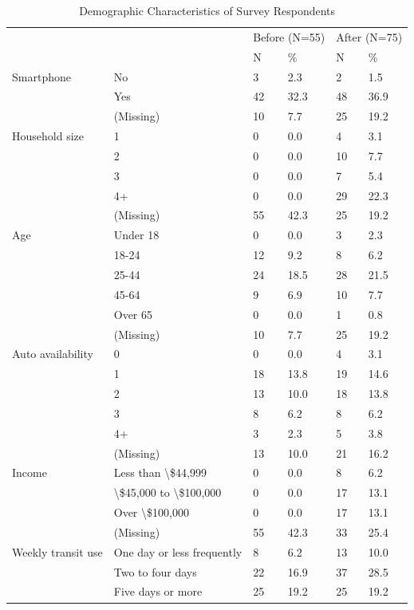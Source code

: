 \documentclass[smartcities,article,submit,moreauthors,pdftex]{Definitions/mdpi}
\begin{document}
\begin{table}[ht]
    \centering
    \caption{Demographic Characteristics of Survey Respondents}
    \label{tab:survey-respondents}
 \renewcommand{\arraystretch}{1.5}
\begin{tabular}[t]{llllll}
\toprule
\multicolumn{2}{c}{ } & \multicolumn{2}{c}{Before (N=55)} & \multicolumn{2}{c}{After (N=75)} \\
\cmidrule(l{3pt}r{3pt}){3-4} \cmidrule(l{3pt}r{3pt}){5-6}
  &    & N & \% & N  & \% \\
\midrule
Smartphone & No & 3 & 2.3 & 2 & 1.5\\
 & Yes & 42 & 32.3 & 48 & 36.9\\
 & (Missing) & 10 & 7.7 & 25 & 19.2\\
Household size & 1 & 0 & 0.0 & 4 & 3.1\\
 & 2 & 0 & 0.0 & 10 & 7.7\\
 & 3 & 0 & 0.0 & 7 & 5.4\\
 & 4+ & 0 & 0.0 & 29 & 22.3\\
 & (Missing) & 55 & 42.3 & 25 & 19.2\\
Age & Under 18 & 0 & 0.0 & 3 & 2.3\\
 & 18-24 & 12 & 9.2 & 8 & 6.2\\
 & 25-44 & 24 & 18.5 & 28 & 21.5\\
 & 45-64 & 9 & 6.9 & 10 & 7.7\\
 & Over 65 & 0 & 0.0 & 1 & 0.8\\
 & (Missing) & 10 & 7.7 & 25 & 19.2\\
Auto availability & 0 & 0 & 0.0 & 4 & 3.1\\
 & 1 & 18 & 13.8 & 19 & 14.6\\
 & 2 & 13 & 10.0 & 18 & 13.8\\
 & 3 & 8 & 6.2 & 8 & 6.2\\
 & 4+ & 3 & 2.3 & 5 & 3.8\\
 & (Missing) & 13 & 10.0 & 21 & 16.2\\
Income & Less than \textbackslash{}\$44,999 & 0 & 0.0 & 8 & 6.2\\
 & \textbackslash{}\$45,000 to \textbackslash{}\$100,000 & 0 & 0.0 & 17 & 13.1\\
 & Over \textbackslash{}\$100,000 & 0 & 0.0 & 17 & 13.1\\
 & (Missing) & 55 & 42.3 & 33 & 25.4\\
Weekly transit use & One day or less frequently & 8 & 6.2 & 13 & 10.0\\
 & Two to four days & 22 & 16.9 & 37 & 28.5\\
 & Five days or more & 25 & 19.2 & 25 & 19.2\\
\bottomrule
\end{tabular}
\end{table}
\end{document}
